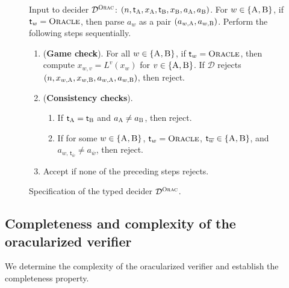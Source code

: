 \documentclass[11pt]{article}
\theoremstyle{definition}
\newcommand{\decider}{\mathcal{D}}
\newcommand{\gamestyle}[1]{\ensuremath{\textsc{#1}}\xspace}
\newcommand{\ora}{\gamestyle{Orac}}
\newcommand{\labelstyle}[1]{\ensuremath{\textsc{#1}}\xspace}
\newcommand{\tvarstyle}[1]{\mathsf{#1}}
\newcommand{\tvar}{\ensuremath{\tvarstyle{t}}}
\newcommand{\alice}{\labelstyle{A}}
\newcommand{\bob}{\labelstyle{B}}
\newcommand{\oracle}{\labelstyle{Oracle}}
\newenvironment{gamespec}{
  \begin{mdframed}[style=figstyle]}{
  \end{mdframed}}
\begin{document}
\begin{figure}[!htb]
  \centering
  \begin{gamespec}
    Input to decider $\decider^\ora$: $(n, \tvar_\alice, x_\alice , \tvar_\bob,
    x_\bob ,a_\alice, a_\bob)$.
    For $w \in \{\alice,\bob\}$, if $\tvar_w = \oracle$, then parse $a_w$ as a
    pair $(a_{w, \alice}, a_{w, \bob})$.
    Perform the following steps sequentially.

    \begin{enumerate}
    \item (\textbf{Game check}).
      \label{enu:oracle-game}
      For all $w \in \{\alice,\bob\}$, if $\tvar_w = \oracle$, then compute
      $x_{w,v} = L^v(x_w)$ for $v \in \{\alice,\bob\}$.
      If $\decider$ rejects $(n,
      x_{w,\alice},x_{w,\bob},a_{w,\alice},a_{w,\bob})$, then reject.

    \item (\textbf{Consistency checks}).
      \label{enu:oracle-full-consistency}
      \begin{enumerate}[nosep]
      \item \label{enu:check-same} If $\tvar_\alice = \tvar_\bob$ and $a_\alice
        \neq a_\bob$, then reject.
      \item \label{enu:oracle-versus-player} If for some $w \in
        \{\alice,\bob\}$, $\tvar_w = \oracle$, $\tvar_{\overline{w}} \in
        \{\alice,\bob\}$, and $a_{w,\, \tvar_{\overline{w}}} \neq
        a_{\overline{w}}$, then reject.
      \end{enumerate}
    \item \label{enu:oracle-acc} Accept if none of the preceding steps rejects.
    \end{enumerate}
  \end{gamespec}
  \caption{Specification of the typed decider $\decider^\ora$.}
  \label{fig:oracle-decider}
\end{figure}


\subsection{Completeness and complexity of the oracularized verifier}

We determine the complexity of the oracularized verifier and
establish the completeness property.
\end{document}
